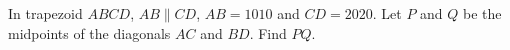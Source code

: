 In trapezoid $ABCD$, $AB\parallel CD$, $AB=1010$ and $CD=2020$. Let $P$ and $Q$ be the midpoints of the diagonals $AC$ and $BD$. Find $PQ$.
